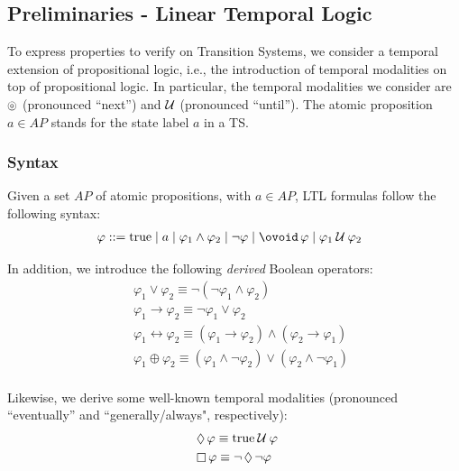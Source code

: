 \documentclass{article}
\begin{document}
\subsection{Preliminaries - Linear Temporal Logic}
\label{subsec-ltl}
To express properties to verify on Transition Systems, we consider a temporal extension of propositional logic, i.e., 
the introduction of temporal modalities on top of propositional logic. In particular, the temporal
modalities we consider are $\ocircle$ (pronounced ``next'') and $\mathbin{\mathcal{U}}$ (pronounced ``until'').
The atomic proposition $a \in AP$ stands for the state label $a$ in a TS.

\subsubsection*{Syntax}
Given a set $AP$ of atomic propositions, with $a \in AP$, LTL formulas follow the following syntax: 
\begin{align*}
    &\; \varphi ::= \text{true} \mid a \mid \varphi_1 \land \varphi_2 \mid \neg \varphi \mid \lnext{\varphi} \mid \lluntil{\varphi_1}{\varphi_2}
\end{align*}

In addition, we introduce the following \emph{derived} Boolean operators: 
\begin{align*}
    &\; \varphi_1 \lor \varphi_2 \equiv \neg (\neg \varphi_1 \land \varphi_2) \\
    &\; \varphi_1 \rightarrow \varphi_2 \equiv \neg \varphi_1 \lor \varphi_2 \\
    &\; \varphi_1 \leftrightarrow  \varphi_2 \equiv (\varphi_1 \rightarrow \varphi_2) \land (\varphi_2 \rightarrow \varphi_1) \\
    &\; \varphi_1 \oplus  \varphi_2 \equiv (\varphi_1 \land \neg \varphi_2) \lor (\varphi_2 \land \neg \varphi_1)\\
\end{align*}

Likewise, we derive some well-known temporal modalities (pronounced ``eventually'' and ``generally/always", respectively):
\begin{align*}
    &\; \mathop{\Diamond} \varphi \equiv \text{true} \mathbin{\mathcal{U}} \varphi \\
    &\; \mathop{\Box} \varphi \equiv \neg \mathop{\Diamond} \neg \varphi \\
\end{align*}
\end{document}
